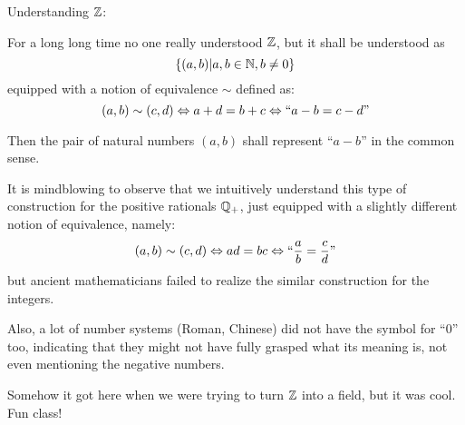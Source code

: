 \begin{remark} Understanding \(\mathbb{Z}\):

    For a long long time no one really understood \(\mathbb{Z}\), but it shall be understood as \[
        \{(a, b) | a, b \in \mathbb{N}, b \neq 0\}
    \]
    equipped with a notion of equivalence \(\sim\) defined as:
    \[
        (a, b) \sim (c, d) \Leftrightarrow a + d = b + c \Leftrightarrow ``a - b = c - d"
    \]

    Then the pair of natural numbers \((a, b)\) shall represent ``\(a-b\)'' in the common sense.

    It is mindblowing to observe that we intuitively understand this type of construction for the positive rationals \(\mathbb{Q}_+\), just equipped with a slightly different notion of equivalence, namely:
    \[
        (a, b) \sim (c, d) \Leftrightarrow ad = bc \Leftrightarrow ``
        \frac{a}{b} = \frac{c}{d}"
    \]
    but ancient mathematicians failed to realize the similar construction for the integers.

    Also, a lot of number systems (Roman, Chinese) did not have the symbol for ``0'' too, indicating that they might not have fully grasped what its meaning is, not even mentioning the negative numbers.

    Somehow it got here when we were trying to turn \(\mathbb{Z}\) into a field, but it was cool. Fun class!
\end{remark}